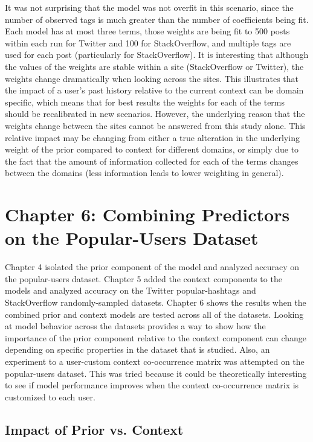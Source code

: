 \documentclass[man,floatsintext,donotrepeattitle]{apa6}
\begin{document}
It was not surprising that the model was not overfit in this scenario, since the number of observed tags is much greater than the number of coefficients being fit.
Each model has at most three terms, those weights are being fit to 500 posts within each run for Twitter and 100 for StackOverflow, and multiple tags are used for each post (particularly for StackOverflow).
It is interesting that although the values of the weights are stable within a site (StackOverflow or Twitter), the weights change dramatically when looking across the sites.
This illustrates that the impact of a user's past history relative to the current context can be domain specific, which means that for best results the weights for each of the terms should be recalibrated in new scenarios.
However, the underlying reason that the weights change between the sites cannot be answered from this study alone.
This relative impact may be changing from either a true alteration in the underlying weight of the prior compared to context for different domains,
or simply due to the fact that the amount of information collected for each of the terms changes between the domains (less information leads to lower weighting in general). 

\clearpage
\section{Chapter 6: Combining Predictors on the Popular-Users Dataset}

Chapter 4 isolated the prior component of the model and analyzed accuracy on the popular-users dataset.
Chapter 5 added the context components to the models and analyzed accuracy on the Twitter popular-hashtags and StackOverflow randomly-sampled datasets.
Chapter 6 shows the results when the combined prior and context models are tested across all of the datasets.
Looking at model behavior across the datasets provides a way to show how the importance of the prior component relative to the context component can change depending on specific properties in the dataset that is studied.
Also, an experiment to a user-custom context co-occurrence matrix was attempted on the popular-users dataset.
This was tried because it could be theoretically interesting to see if model performance improves when the context co-occurrence matrix is customized to each user.

\subsection{Impact of Prior vs. Context}
\end{document}
